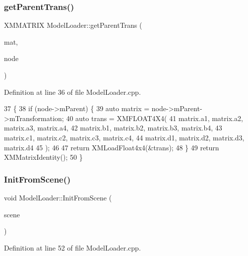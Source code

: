 \subsubsection{\texorpdfstring{get\+Parent\+Trans()}{getParentTrans()}}
{\footnotesize\ttfamily X\+M\+M\+A\+T\+R\+IX Model\+Loader\+::get\+Parent\+Trans (\begin{DoxyParamCaption}\item[{X\+M\+M\+A\+T\+R\+IX}]{mat,  }\item[{ai\+Node $\ast$}]{node }\end{DoxyParamCaption})\hspace{0.3cm}{\ttfamily [private]}}



Definition at line 36 of file Model\+Loader.\+cpp.


\begin{DoxyCode}
37 \{
38     \textcolor{keywordflow}{if} (node->mParent) \{
39         \textcolor{keyword}{auto} matrix = node->mParent->mTransformation;
40         \textcolor{keyword}{auto} trans = XMFLOAT4X4(
41             matrix.a1, matrix.a2, matrix.a3, matrix.a4,
42             matrix.b1, matrix.b2, matrix.b3, matrix.b4,
43             matrix.c1, matrix.c2, matrix.c3, matrix.c4,
44             matrix.d1, matrix.d2, matrix.d3, matrix.d4
45         );
46 
47         \textcolor{keywordflow}{return} XMLoadFloat4x4(&trans);
48     \}
49     \textcolor{keywordflow}{return} XMMatrixIdentity();
50 \}
\end{DoxyCode}
\mbox{\label{class_model_loader_ae809d56b350b003306b484c3bbc1b5e3}} 
\subsubsection{\texorpdfstring{Init\+From\+Scene()}{InitFromScene()}}
{\footnotesize\ttfamily void Model\+Loader\+::\+Init\+From\+Scene (\begin{DoxyParamCaption}\item[{const ai\+Scene $\ast$}]{scene }\end{DoxyParamCaption})\hspace{0.3cm}{\ttfamily [private]}}



Definition at line 52 of file Model\+Loader.\+cpp.


